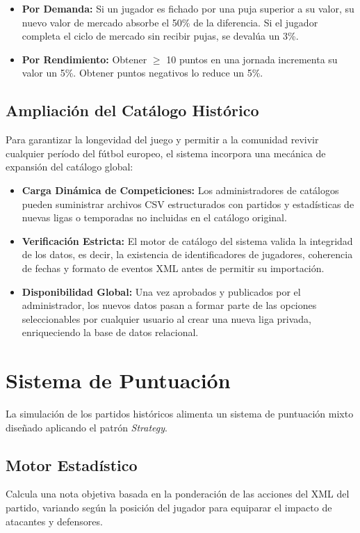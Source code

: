 \begin{itemize}
    \item \textbf{Por Demanda:} Si un jugador es fichado por una puja superior a su valor, su nuevo valor de mercado absorbe el 50\% de la diferencia. Si el jugador completa el ciclo de mercado sin recibir pujas, se devalúa un 3\%.
    \item \textbf{Por Rendimiento:} Obtener \(\geq\) 10 puntos en una jornada incrementa su valor un 5\%. Obtener puntos negativos lo reduce un 5\%.
\end{itemize}

\subsection{Ampliación del Catálogo Histórico}
Para garantizar la longevidad del juego y permitir a la comunidad revivir cualquier período del fútbol europeo, el sistema incorpora una mecánica de expansión del catálogo global:
\begin{itemize}
    \item \textbf{Carga Dinámica de Competiciones:} Los administradores de catálogos pueden suministrar archivos CSV estructurados con partidos y estadísticas de nuevas ligas o temporadas no incluidas en el catálogo original.
    \item \textbf{Verificación Estricta:} El motor de catálogo del sistema valida la integridad de los datos, es decir, la existencia de identificadores de jugadores, coherencia de fechas y formato de eventos XML antes de permitir su importación.
    \item \textbf{Disponibilidad Global:} Una vez aprobados y publicados por el administrador, los nuevos datos pasan a formar parte de las opciones seleccionables por cualquier usuario al crear una nueva liga privada, enriqueciendo la base de datos relacional.
\end{itemize}

\section{Sistema de Puntuación}
\label{sec:gdd_puntuacion}

La simulación de los partidos históricos alimenta un sistema de puntuación mixto diseñado aplicando el patrón \textit{Strategy}.

\subsection{Motor Estadístico}
Calcula una nota objetiva basada en la ponderación de las acciones del XML del partido, variando según la posición del jugador para equiparar el impacto de atacantes y defensores.

